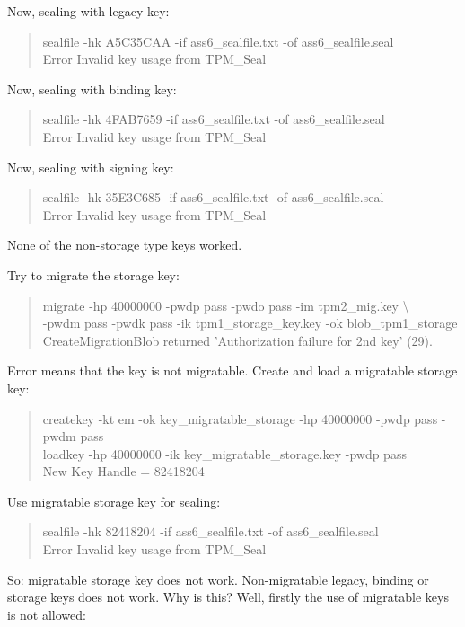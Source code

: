 \documentclass[10pt]{article}
\begin{document}
Now, sealing with legacy key:
\begin{quote}
sealfile -hk A5C35CAA -if ass6\_sealfile.txt -of ass6\_sealfile.seal \\
Error Invalid key usage from TPM\_Seal
\end{quote}

Now, sealing with binding key:
\begin{quote}
sealfile -hk 4FAB7659 -if ass6\_sealfile.txt -of ass6\_sealfile.seal\\
Error Invalid key usage from TPM\_Seal
\end{quote}

Now, sealing with signing key:
\begin{quote}
sealfile -hk 35E3C685 -if ass6\_sealfile.txt -of ass6\_sealfile.seal \\
Error Invalid key usage from TPM\_Seal
\end{quote}

None of the non-storage type keys worked. 

Try to migrate the storage key:
\begin{quote}
migrate -hp 40000000 -pwdp pass -pwdo pass -im tpm2\_mig.key \textbackslash \\
-pwdm pass -pwdk pass -ik tpm1\_storage\_key.key -ok blob\_tpm1\_storage \\
CreateMigrationBlob returned 'Authorization failure for 2nd key' (29).
\end{quote}

Error means that the key is not migratable. 
Create and load a migratable storage key:
\begin{quote}
createkey -kt em -ok key\_migratable\_storage -hp 40000000 -pwdp pass -pwdm pass \\
loadkey -hp 40000000 -ik key\_migratable\_storage.key -pwdp pass \\
New Key Handle = 82418204
\end{quote}

Use migratable storage key for sealing:
\begin{quote}
sealfile -hk 82418204 -if ass6\_sealfile.txt -of ass6\_sealfile.seal \\
Error Invalid key usage from TPM\_Seal
\end{quote}

So: migratable storage key does not work. Non-migratable legacy, binding or 
storage keys does not work. Why is this? Well, firstly the use of migratable keys 
is not allowed: 
\end{document}
